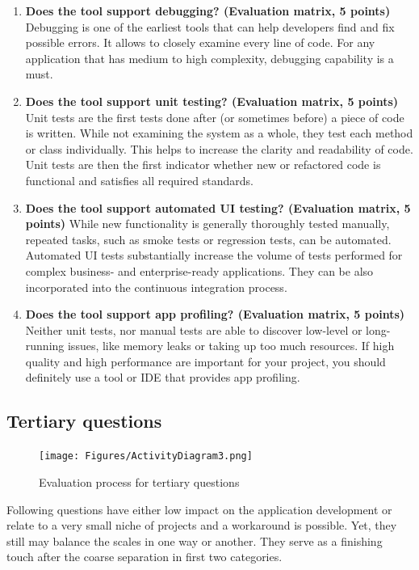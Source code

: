 \documentclass[english,master,public,dept460,male,cpdeclaration,oneside]{diploma}
\begin{document}
\begin{enumerate}
	\item \textbf{Does the tool support debugging? (Evaluation matrix, 5 points) }
	Debugging is one of the earliest tools that can help developers find and fix possible errors. It allows to closely examine every line of code. For any application that has medium to high complexity, debugging capability is a must.
	
	\item \textbf{Does the tool support unit testing? (Evaluation matrix, 5 points) }
	Unit tests are the first tests done after (or sometimes before) a piece of code is written. While not examining the system as a whole, they test each method or class individually. This helps to increase the clarity and readability of code. Unit tests are then the first indicator whether new or refactored code is functional and satisfies all required standards.
	
	\item \textbf{Does the tool support automated UI testing? (Evaluation matrix, 5 points) }
	While new functionality is generally thoroughly tested manually, repeated tasks, such as smoke tests or regression tests, can be automated. Automated UI tests substantially increase the volume of tests performed for complex business- and enterprise-ready applications. They can be also incorporated into the continuous integration process.
	
	\item \textbf{Does the tool support app profiling? (Evaluation matrix, 5 points) }
	Neither unit tests, nor manual tests are able to discover low-level or long-running issues, like memory leaks or taking up too much resources. If high quality and high performance are important for your project, you should definitely use a tool or IDE that provides app profiling.
\end{enumerate}



\subsection{Tertiary questions}

\begin{figure}
	\centering\texttt{[image: Figures/ActivityDiagram3.png]}
	\caption{Evaluation process for tertiary questions}
	\label{figure:activityTertiary}
\end{figure}

Following questions have either low impact on the application development or relate to a very small niche of projects and a workaround is possible. Yet, they still may balance the scales in one way or another. They serve as a finishing touch after the coarse separation in first two categories.
\end{document}
